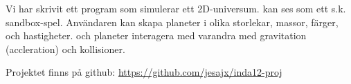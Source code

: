 Vi har skrivit ett program som simulerar ett 2D-universum.
kan ses som ett s.k. sandbox-spel.
Användaren kan skapa planeter i olika
storlekar, massor, färger, och hastigheter.
och planeter interagera med varandra med gravitation (accleration)
och kollisioner.

Projektet finns på github:
\url{https://github.com/jesajx/inda12-proj}
